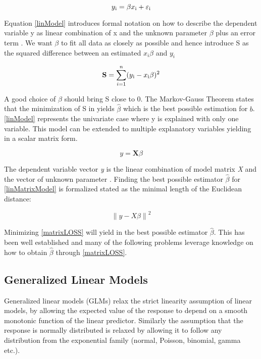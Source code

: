 \documentclass{article}
\begin{document}
    \begin{equation}  \label{linModel} y\textsubscript{i} = \beta x\textsubscript{i} + \varepsilon\textsubscript{i} \end{equation}

    Equation \ref{linModel} introduces formal notation on how to describe the dependent variable y as linear combination of x and the unknown parameter $\beta$ plus an error term \textepsilon. We want $\beta$ to fit all data as closely as possible and hence introduce S as the squared difference between an estimated $x_i \beta$ and $y_i$

    \begin{equation} \label{sumSquares} \mathbf{S} =  \sum_{i=1}^{n}(y\textsubscript{i} - x\textsubscript{i}\beta)^{2} \end{equation}

    A good choice of $\beta$ should bring S close to 0. The  Markov-Gauss Theorem states that the minimization of S in yields $\widehat{\beta}$ which is the best possible estimation for $b$. \ref{linModel} represents the univariate case where y is explained with only one variable. This model can be extended to multiple explanatory variables yielding in a scalar matrix form.

    \begin{equation}  \label{linMatrixModel} y =  \mathbf{X} \beta \end{equation}

     The dependent  variable vector \textit{y} is the linear combination of model matrix \textit{X} and the vector of unknown parameter \textbeta. Finding the best possible estimator $\widehat{\beta}$ for \ref{linMatrixModel} is formalized stated as the minimal length of the Euclidean distance:

    \begin{equation} \label{matrixLOSS} \left \| y - X\beta  \right \|^2 \end{equation}

    Minimizing \ref{matrixLOSS} will yield in the best possible estimator $\widehat{\beta}$. This has been well established and many of the following problems leverage knowledge on how to obtain $\widehat{\beta}$ through \ref{matrixLOSS}.

    \subsection{Generalized Linear Models}
    Generalized linear models (GLMs) relax the strict linearity assumption of linear models, by allowing the expected value of the response to depend on a smooth monotonic function of the linear predictor. Similarly the assumption that the response is normally distributed is relaxed by allowing it to follow any distribution from the exponential family (normal, Poisson, binomial, gamma etc.).
\end{document}
